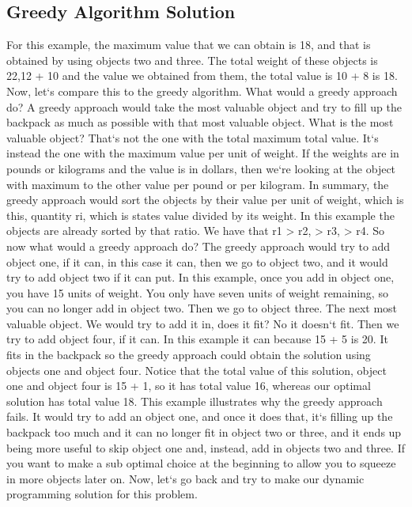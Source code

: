 \subsection{Greedy Algorithm  Solution}
For this example, the maximum value that we can obtain is 18, and that is obtained by using objects two and three.
The total weight of these objects is 22,12 + 10 and the value we obtained from them, the total value is 10 + 8 is 18.
Now, let`s compare this to the greedy algorithm.
What would a greedy approach do? A greedy approach would take the most valuable object and try to fill up the backpack as much as possible with that most valuable object.
What is the most valuable object? That`s not the one with the total maximum total value.
It`s instead the one with the maximum value per unit of weight.
If the weights are in pounds or kilograms and the value is in dollars, then we`re looking at the object with maximum to the other value per pound or per kilogram.
In summary, the greedy approach would sort the objects by their value per unit of weight, which is this, quantity ri, which is states value divided by its weight.
In this example the objects are already sorted by that ratio.
We have that r1 \textgreater{} r2, \textgreater{} r3, \textgreater{} r4.
So now what would a greedy approach do? The greedy approach would try to add object one, if it can, in this case it can, then we go to object two, and it would try to add object two if it can put.
In this example, once you add in object one, you have 15 units of weight.
You only have seven units of weight remaining, so you can no longer add in object two.
Then we go to object three.
The next most valuable object.
We would try to add it in, does it fit? No it doesn`t fit.
Then we try to add object four, if it can.
In this example it can because 15 + 5 is 20.
It fits in the backpack so the greedy approach could obtain the solution using objects one and object four.
Notice that the total value of this solution, object one and object four is 15 + 1, so it has total value 16, whereas our optimal solution has total value 18.
This example illustrates why the greedy approach fails.
It would try to add an object one, and once it does that, it`s filling up the backpack too much and it can no longer fit in object two or three, and it ends up being more useful to skip object one and, instead, add in objects two and three.
If you want to make a sub optimal choice at the beginning to allow you to squeeze in more objects later on.
Now, let`s go back and try to make our dynamic programming solution for this problem.

